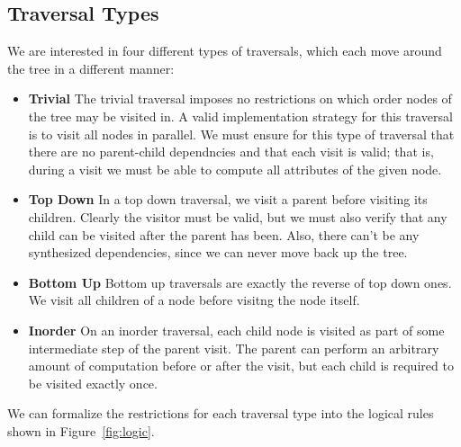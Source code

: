 \documentclass[10pt]{article}
\begin{document}
    \subsection{Traversal Types}
    We are interested in four different types of traversals, which each move around the tree in a different manner:
    \begin{itemize}
        \item \textbf{Trivial} The trivial traversal imposes no restrictions on which order nodes of the tree may be visited in. A valid implementation strategy for this traversal is to visit all nodes in parallel. We must ensure for this type of traversal that there are no parent-child dependncies and that each visit is valid; that is, during a visit we must be able to compute all attributes of the given node.
        \item \textbf{Top Down} In a top down traversal, we visit a parent before visiting its children. Clearly the visitor must be valid, but we must also verify that any child can be visited after the parent has been. Also, there can't be any synthesized dependencies, since we can never move back up the tree.
        \item \textbf{Bottom Up} Bottom up traversals are exactly the reverse of top down ones. We visit all children of a node before visitng the node itself.
        \item \textbf{Inorder} On an inorder traversal, each child node is visited as part of some intermediate step of the parent visit. The parent can perform an arbitrary amount of computation before or after the visit, but each child is required to be visited exactly once.
    \end{itemize}

    We can formalize the restrictions for each traversal type into the logical rules shown in Figure~\ref{fig:logic}.
\end{document}
